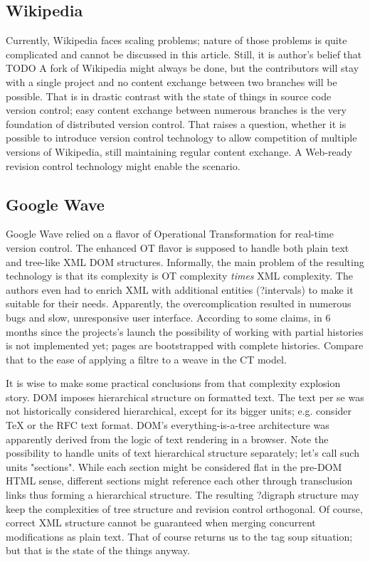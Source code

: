 \documentclass{acm_proc_article-sp}
\begin{document}
\subsection{Wikipedia}

Currently, Wikipedia faces scaling problems; nature of those
problems is quite complicated and cannot be discussed in this
article. Still, it is author's belief that TODO
A fork of Wikipedia might always be done, but the contributors
will stay with a single project and no content exchange between
two branches will be possible. That is in drastic contrast with
the state of things in source code version control; easy content
exchange between numerous branches is the very foundation of
distributed version control. That raises a question, whether it
is possible to introduce version control technology to allow
competition of multiple versions of Wikipedia, still maintaining
regular content exchange. A Web-ready revision control technology
might enable the scenario.

\subsection{Google Wave}

Google Wave relied on a flavor of Operational Transformation for
real-time version control. The enhanced OT flavor is supposed to
handle both plain text and tree-like XML DOM structures.
Informally, the main problem of the resulting technology is that
its complexity is OT complexity \emph{times} XML complexity. 
The authors even had to enrich XML with additional entities 
(?intervals) to make it suitable for their needs. Apparently, the
overcomplication resulted in numerous bugs and slow, 
unresponsive user interface.
According to some claims, in 6 months since the projects's launch
the possibility of working with partial histories is not 
implemented yet; pages are bootstrapped with complete histories.
Compare that to the ease of applying a filtre to a weave in the
CT model.

It is wise to make some practical conclusions from that 
complexity explosion story. 
DOM imposes hierarchical structure on formatted text.
The text per se was not historically considered hierarchical,
except for its bigger units; e.g. consider TeX or the RFC text
format. DOM's everything-is-a-tree architecture was apparently 
derived from the logic of text rendering in a browser.
Note the possibility to handle
units of text hierarchical structure separately; let's call
such units "sections". While each section might
be considered flat in the pre-DOM HTML sense, different sections
might reference each other through transclusion links thus
forming a hierarchical structure.
The resulting ?digraph structure may keep the complexities
of tree structure and revision control orthogonal.
Of course, correct XML structure cannot be guaranteed when
merging concurrent modifications as plain text. That of course
returns us to the tag soup situation; but that is the state of
the things anyway.
\end{document}
